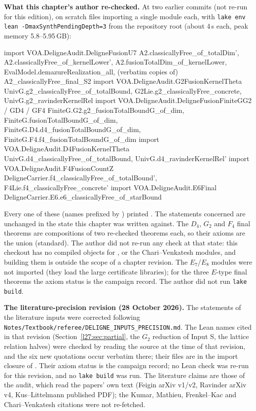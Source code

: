\textbf{What this chapter's author re-checked.} At two earlier commits (not re-run for this edition), on scratch files importing a
single module each, with \texttt{lake env lean -DmaxSynthPendingDepth=3} from the repository root (about 4\,s each, peak memory 5.8--5.95\,GB):
\begin{plaincode}
import VOA.DeligneAudit.DeligneFusionU7
  A2.classicallyFree_of_totalDim', A2.classicallyFree_of_kernelLower',
  A2.fusionTotalDim_of_kernelLower, EvalModel.demazureRealization_all,
  (verbatim copies of) A2_classicallyFree_final_S2
import VOA.DeligneAudit.G2FusionKernelTheta
  UnivG.g2_classicallyFree_of_totalBound, G2Lie.g2_classicallyFree_concrete,
  UnivG.g2_ravinderKernelRel
import VOA.DeligneAudit.DeligneFusionFiniteGG2 / GD4 / GF4
  FiniteG.G2.g2_fusionTotalBoundG_of_dim, FiniteG.fusionTotalBoundG_of_dim,
  FiniteG.D4.d4_fusionTotalBoundG_of_dim, FiniteG.F4.f4_fusionTotalBoundG_of_dim
import VOA.DeligneAudit.D4FusionKernelTheta
  UnivG.d4_classicallyFree_of_totalBound, UnivG.d4_ravinderKernelRel'
import VOA.DeligneAudit.F4FusionCountZ
  DeligneCarrier.f4_classicallyFree_of_totalBound', F4Lie.f4_classicallyFree_concrete'
import VOA.DeligneAudit.E6Final
  DeligneCarrier.E6.e6_classicallyFree_of_starBound
\end{plaincode}
Every one of these (names prefixed by ) printed . The statements
concerned are unchanged in the state this chapter was written against. The $D_4$, $G_2$ and $F_4$ final theorems are compositions of two re-checked theorems each,
so their axioms are the union (standard). The author did not re-run any check at that state: this checkout has no compiled
objects for ,  or the Chari--Venkatesh modules, and building them is outside the scope of a
chapter revision. The $E_7$/$E_8$ modules were not imported (they load the large certificate libraries); for the three $E$-type final
theorems the axiom status is the campaign record. The author did not run \texttt{lake build}.

\textbf{The literature-precision revision (28 October 2026).} The statements of the literature inputs were corrected following
\texttt{Notes/Textbook/referee/DELIGNE\_INPUTS\_PRECISION.md}. The Lean names cited in that revision (Section~\ref{l27:sec:partial},
the $G_2$ reduction of Input S, the lattice relation halves) were checked by reading the source at the time of that revision, and the six new
quotations occur verbatim there; their files are in the import closure of . Their axiom status is the
campaign record; no Lean check was re-run for this revision, and no \texttt{lake build} was run. The literature
claims are those of the audit, which read the papers' own text (Feigin arXiv v1/v2, Ravinder arXiv v4, Kus--Littelmann published
PDF); the Kumar, Mathieu, Frenkel--Kac and Chari--Venkatesh citations were not re-fetched.

